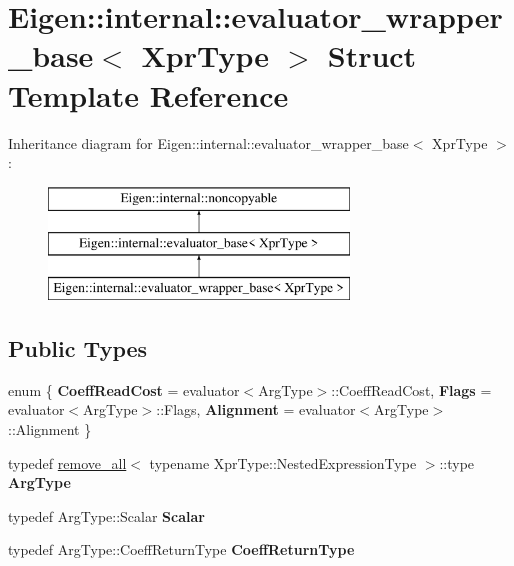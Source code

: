 \hypertarget{struct_eigen_1_1internal_1_1evaluator__wrapper__base}{}\section{Eigen\+::internal\+::evaluator\+\_\+wrapper\+\_\+base$<$ Xpr\+Type $>$ Struct Template Reference}
\label{struct_eigen_1_1internal_1_1evaluator__wrapper__base}
Inheritance diagram for Eigen\+::internal\+::evaluator\+\_\+wrapper\+\_\+base$<$ Xpr\+Type $>$\+:\begin{figure}[H]
\begin{center}
\leavevmode
\includegraphics[height=3.000000cm]{struct_eigen_1_1internal_1_1evaluator__wrapper__base}
\end{center}
\end{figure}
\subsection*{Public Types}
\begin{DoxyCompactItemize}
\item 
\mbox{\label{struct_eigen_1_1internal_1_1evaluator__wrapper__base_aa3e35af1fd1ba3bb249cd2918e8372b6}} 
enum \{ {\bfseries Coeff\+Read\+Cost} = evaluator$<$Arg\+Type$>$\+::Coeff\+Read\+Cost, 
{\bfseries Flags} = evaluator$<$Arg\+Type$>$\+::Flags, 
{\bfseries Alignment} = evaluator$<$Arg\+Type$>$\+::Alignment
 \}
\item 
\mbox{\label{struct_eigen_1_1internal_1_1evaluator__wrapper__base_a5a503ef21501a96d1c29c142d0ef5464}} 
typedef \mbox{\hyperlink{struct_eigen_1_1internal_1_1remove__all}{remove\+\_\+all}}$<$ typename Xpr\+Type\+::\+Nested\+Expression\+Type $>$\+::type {\bfseries Arg\+Type}
\item 
\mbox{\label{struct_eigen_1_1internal_1_1evaluator__wrapper__base_a4da29230682439ead46dabc2d12254b4}} 
typedef Arg\+Type\+::\+Scalar {\bfseries Scalar}
\item 
\mbox{\label{struct_eigen_1_1internal_1_1evaluator__wrapper__base_a27a59fe6d1013f9ad31889a4fd84ceb0}} 
typedef Arg\+Type\+::\+Coeff\+Return\+Type {\bfseries Coeff\+Return\+Type}
\end{DoxyCompactItemize}
